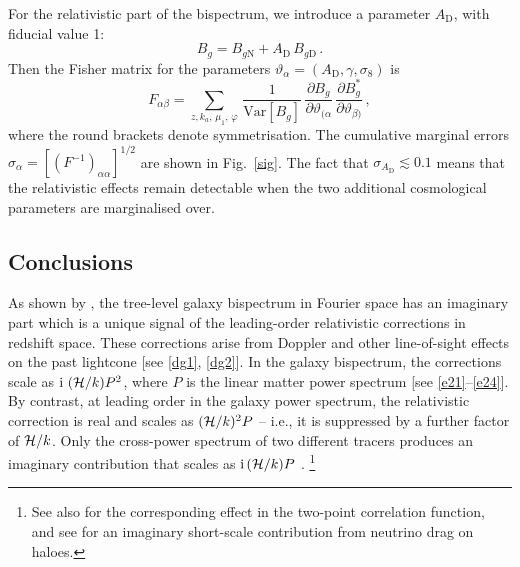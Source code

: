 For the relativistic part of the bispectrum, we introduce a parameter  $A_{\mathrm{D}}$, with fiducial value 1: 
\begin{equation}
B_g=B_{g\mathrm{N}}+A_{\mathrm{D}}\,B_{g\mathrm{D}} \,.
\end{equation}
Then the Fisher matrix for the parameters  $\vartheta_\alpha=(A_{\mathrm{D}},\gamma,\sigma_8)$ is
\begin{equation}
F_{\alpha\beta} = 
\sum_{z,k_a,\,\mu_{1},\,\varphi}\,\frac{1}{{\mathrm{Var}} [{B_{g}}]}
\,\frac{\partial B_{g}}{\partial \vartheta_{(\alpha}}\,\frac{\partial B^*_{g}}{\partial \vartheta_{\beta)}}\,,\label{fm}
\end{equation} 
where the round brackets denote symmetrisation. The cumulative marginal errors $\sigma_\alpha = [(F^{-1})_{\alpha\alpha}]^{1/2}$  are shown in Fig.~\ref{sig}. The fact that $\sigma_{A_{\mathrm{D}}}\lesssim 0.1$  means that the relativistic effects remain detectable when the two additional cosmological parameters are marginalised over.
%

\subsection{Conclusions}


As shown by \cite{Clarkson:2018dwn}, the tree-level galaxy bispectrum in Fourier space has an imaginary part which is a unique signal of the leading-order relativistic corrections in redshift space. These corrections arise from Doppler and other line-of-sight effects on the past lightcone [see \eqref{dg1}, \eqref{dg2}]. In the galaxy bispectrum, the corrections scale as ${\mathrm{i\,}}\,(\mathcal{H}/k)P^2$, where $P$ is the linear matter power spectrum [see \eqref{e21}--\eqref{e24}]. By contrast,  at leading order in the galaxy power spectrum, the relativistic correction is real and scales as $(\mathcal{H}/k)^2P$ -- i.e., it is suppressed by a further factor of  $\mathcal{H}/k$. 
Only the cross-power spectrum of two different tracers produces an imaginary contribution that scales as ${\mathrm{i\,}}(\mathcal{H}/k)P$ \cite{McDonald:2009dh}.
\footnote{See also \cite{Bonvin:2013ogt, Bonvin:2015kuc, Gaztanaga:2015jrs, Irsic:2015nla, Hall:2016bmm,Lepori:2017twd,Bonvin:2018ckp, Lepori:2019cqp} for the corresponding effect in the two-point correlation function, and see \cite{Okoli:2016vmd} for an imaginary {short-scale} contribution from neutrino drag on haloes.}


